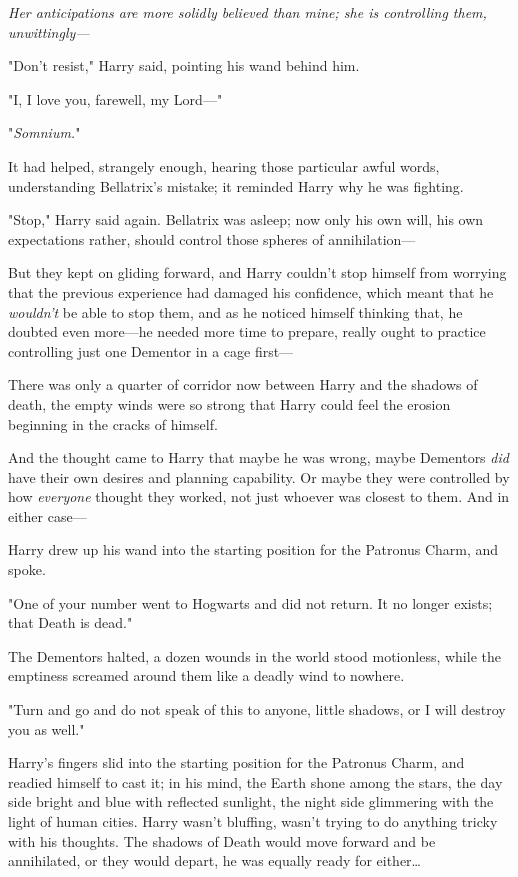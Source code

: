 \emph{Her anticipations are more solidly believed than mine; she is controlling 
them, unwittingly---}

"Don't resist," Harry said, pointing his wand behind him.

"I, I love you, farewell, my Lord---"

"\emph{Somnium.}"

It had helped, strangely enough, hearing those particular awful words, 
understanding Bellatrix's mistake; it reminded Harry why he was fighting.

"Stop," Harry said again. Bellatrix was asleep; now only his own will, his own 
expectations rather, should control those spheres of annihilation---

But they kept on gliding forward, and Harry couldn't stop himself from worrying 
that the previous experience had damaged his confidence, which meant that he 
\emph{wouldn't} be able to stop them, and as he noticed himself thinking that, 
he doubted even more---he needed more time to prepare, really ought to practice 
controlling just one Dementor in a cage first---

There was only a quarter of corridor now between Harry and the shadows of 
death, the empty winds were so strong that Harry could feel the erosion 
beginning in the cracks of himself.

And the thought came to Harry that maybe he was wrong, maybe Dementors 
\emph{did} have their own desires and planning capability. Or maybe they were 
controlled by how \emph{everyone} thought they worked, not just whoever was 
closest to them. And in either case---

Harry drew up his wand into the starting position for the Patronus Charm, and 
spoke.

"One of your number went to Hogwarts and did not return. It no longer exists; 
that Death is dead."

The Dementors halted, a dozen wounds in the world stood motionless, while the 
emptiness screamed around them like a deadly wind to nowhere.

"Turn and go and do not speak of this to anyone, little shadows, or I will 
destroy you as well."

Harry's fingers slid into the starting position for the Patronus Charm, and 
readied himself to cast it; in his mind, the Earth shone among the stars, the 
day side bright and blue with reflected sunlight, the night side glimmering 
with the light of human cities. Harry wasn't bluffing, wasn't trying to do 
anything tricky with his thoughts. The shadows of Death would move forward and 
be annihilated, or they would depart, he was equally ready for either{\ldots}

